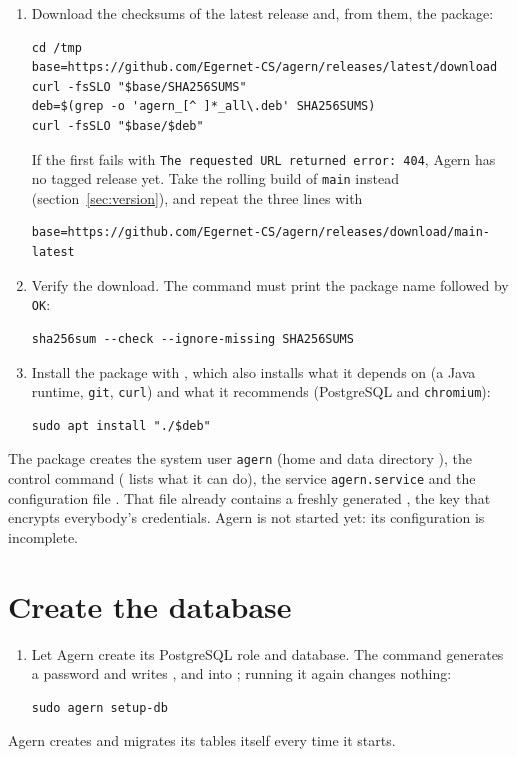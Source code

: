 \begin{enumerate}
  \item Download the checksums of the latest release and, from them, the package:
\begin{lstlisting}
cd /tmp
base=https://github.com/Egernet-CS/agern/releases/latest/download
curl -fsSLO "$base/SHA256SUMS"
deb=$(grep -o 'agern_[^ ]*_all\.deb' SHA256SUMS)
curl -fsSLO "$base/$deb"
\end{lstlisting}
    If the first  fails with \texttt{The requested URL returned error: 404}, Agern has no
    tagged release yet. Take the rolling build of \texttt{main} instead (section~\ref{sec:version}),
    and repeat the three  lines with
\begin{lstlisting}
base=https://github.com/Egernet-CS/agern/releases/download/main-latest
\end{lstlisting}
  \item Verify the download. The command must print the package name followed by \texttt{OK}:
\begin{lstlisting}
sha256sum --check --ignore-missing SHA256SUMS
\end{lstlisting}
  \item Install the package with , which also installs what it depends on (a Java runtime,
    \texttt{git}, \texttt{curl}) and what it recommends (PostgreSQL and \texttt{chromium}):
\begin{lstlisting}
sudo apt install "./$deb"
\end{lstlisting}
\end{enumerate}

The package creates the system user \texttt{agern} (home and data directory
), the control command  ( lists what it can do),
the service \texttt{agern.service} and the configuration file . That
file already contains a freshly generated , the key that encrypts
everybody's credentials. Agern is not started yet: its configuration is incomplete.

\section{Create the database}\label{sec:setup-db}

\begin{enumerate}
  \item Let Agern create its PostgreSQL role and database. The command generates a password and
    writes ,  and  into
    ; running it again changes nothing:
\begin{lstlisting}
sudo agern setup-db
\end{lstlisting}
\end{enumerate}
Agern creates and migrates its tables itself every time it starts.

